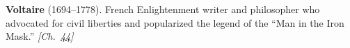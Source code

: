 \textbf{Voltaire} (1694–1778). French Enlightenment writer and philosopher who advocated for civil liberties and popularized the legend of the ``Man in the Iron Mask.'' \emph{[Ch.~\hyperref[ch:ironmask]{44}]}

